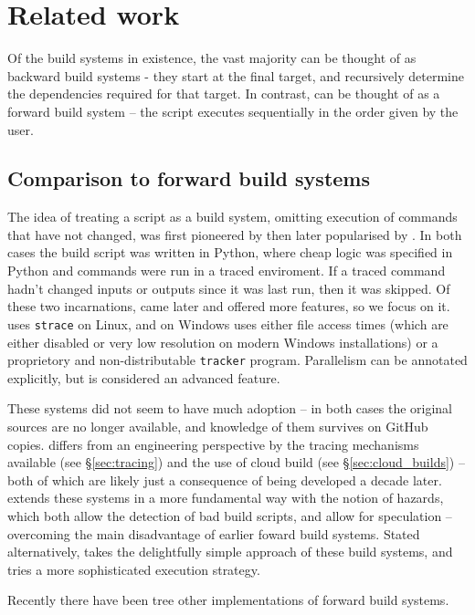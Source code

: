 \section{Related work}
\label{sec:related}

Of the build systems in existence, the vast majority can be thought of as backward build systems - they start at the final target, and recursively determine the dependencies required for that target. In contrast, \Rattle can be thought of as a forward build system -- the script executes sequentially in the order given by the user.

\subsection{Comparison to forward build systems}

The idea of treating a script as a build system, omitting execution of commands that have not changed, was first pioneered by \Memoize \cite{memoize} then later popularised by \Fabricate \cite{fabricate}. In both cases the build script was written in Python, where cheap logic was specified in Python and commands were run in a traced enviroment. If a traced command hadn't changed inputs or outputs since it was last run, then it was skipped. Of these two incarnations, \Fabricate came later and offered more features, so we focus on it. \Fabricate uses \texttt{strace} on Linux, and on Windows uses either file access times (which are either disabled or very low resolution on modern Windows installations) or a proprietory and non-distributable \texttt{tracker} program. Parallelism can be annotated explicitly, but is considered an advanced feature.

These systems did not seem to have much adoption -- in both cases the original sources are no longer available, and knowledge of them survives on GitHub copies. \Rattle differs from an engineering perspective by the tracing mechanisms available (see \S\ref{sec:tracing}) and the use of cloud build (see \S\ref{sec:cloud_builds}) -- both of which are likely just a consequence of being developed a decade later. \Rattle extends these systems in a more fundamental way with the notion of hazards, which both allow the detection of bad build scripts, and allow for speculation -- overcoming the main disadvantage of earlier foward build systems. Stated alternatively, \Rattle takes the delightfully simple approach of these build systems, and tries a more sophisticated execution strategy.

Recently there have been tree other implementations of forward build systems.

